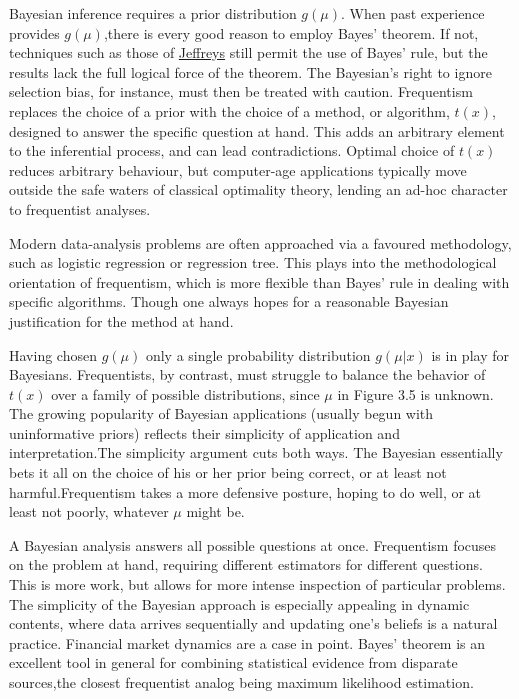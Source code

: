 \documentclass{article}
\begin{document}
Bayesian inference requires a prior distribution \(g(\mu)\). When past
experience provides \(g(\mu)\),there is every good reason to employ
Bayes' theorem. If not, techniques such as those of
\href{https://en.wikipedia.org/wiki/Jeffreys_prior}{Jeffreys} still
permit the use of Bayes' rule, but the results lack the full logical
force of the theorem. The Bayesian's right to ignore selection bias, for
instance, must then be treated with caution. Frequentism replaces the
choice of a prior with the choice of a method, or algorithm, \(t(x)\),
designed to answer the specific question at hand. This adds an arbitrary
element to the inferential process, and can lead contradictions. Optimal
choice of \(t(x)\) reduces arbitrary behaviour, but computer-age
applications typically move outside the safe waters of classical
optimality theory, lending an ad-hoc character to frequentist analyses.

Modern data-analysis problems are often approached via a favoured
methodology, such as logistic regression or regression tree. This plays
into the methodological orientation of frequentism, which is more
flexible than Bayes' rule in dealing with specific algorithms. Though
one always hopes for a reasonable Bayesian justification for the method
at hand.

Having chosen \(g(\mu)\) only a single probability distribution
\(g(\mu|x)\) is in play for Bayesians. Frequentists, by contrast, must
struggle to balance the behavior of \(t(x)\) over a family of possible
distributions, since \(\mu\) in Figure 3.5 is unknown. The growing
popularity of Bayesian applications (usually begun with uninformative
priors) reflects their simplicity of application and interpretation.The
simplicity argument cuts both ways. The Bayesian essentially bets it all
on the choice of his or her prior being correct, or at least not
harmful.Frequentism takes a more defensive posture, hoping to do well,
or at least not poorly, whatever \(\mu\) might be.

A Bayesian analysis answers all possible questions at once. Frequentism
focuses on the problem at hand, requiring different estimators for
different questions. This is more work, but allows for more intense
inspection of particular problems. The simplicity of the Bayesian
approach is especially appealing in dynamic contents, where data arrives
sequentially and updating one's beliefs is a natural practice. Financial
market dynamics are a case in point. Bayes' theorem is an excellent tool
in general for combining statistical evidence from disparate sources,the
closest frequentist analog being maximum likelihood estimation.
\end{document}
